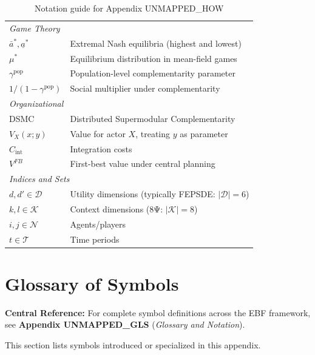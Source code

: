 \begin{table}[h]
\begin{tabular}{p{2.5cm}p{10cm}}
\midrule
\multicolumn{2}{l}{\textit{Game Theory}} \\
$\bar{a}^*, \underline{a}^*$ & Extremal Nash equilibria (highest and lowest) \\
$\mu^*$ & Equilibrium distribution in mean-field games \\
$\gamma^{\text{pop}}$ & Population-level complementarity parameter \\
$1/(1 - \gamma^{\text{pop}})$ & Social multiplier under complementarity \\
\midrule
\multicolumn{2}{l}{\textit{Organizational}} \\
DSMC & Distributed Supermodular Complementarity \\
$V_X(x; y)$ & Value for actor $X$, treating $y$ as parameter \\
$C_{\text{int}}$ & Integration costs \\
$V^{FB}$ & First-best value under central planning \\
\midrule
\multicolumn{2}{l}{\textit{Indices and Sets}} \\
$d, d' \in \mathcal{D}$ & Utility dimensions (typically FEPSDE: $|\mathcal{D}| = 6$) \\
$k, l \in \mathcal{K}$ & Context dimensions (8Ψ: $|\mathcal{K}| = 8$) \\
$i, j \in \mathcal{N}$ & Agents/players \\
$t \in \mathcal{T}$ & Time periods \\
\bottomrule
\end{tabular}
\caption{Notation guide for Appendix UNMAPPED_HOW}
\label{tab:notation}
\end{table}



\section{Glossary of Symbols}
\label{sec:B-glossary}

\begin{tcolorbox}[colback=blue!5!white, colframe=blue!75!black]
\textbf{Central Reference:} For complete symbol definitions across the EBF 
framework, see \textbf{Appendix UNMAPPED_GLS} (\textit{Glossary and Notation}).

This section lists symbols introduced or specialized in this appendix.
\end{tcolorbox}

